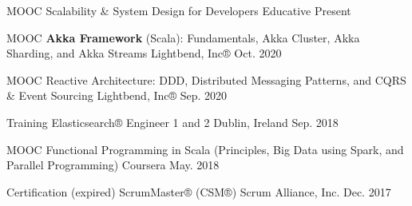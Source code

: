 
\begin{cvhonors}

  \cvhonor
    {MOOC}
    {Scalability \& System Design for Developers}
    {Educative}
    {Present}

  \cvhonor
    {MOOC}
    {\textbf{Akka Framework} (Scala): Fundamentals, Akka Cluster, Akka Sharding, and Akka Streams}
    {Lightbend, Inc®}
    {Oct. 2020}

  \cvhonor
    {MOOC}
    {Reactive Architecture: DDD, Distributed Messaging Patterns, and CQRS \& Event Sourcing}
    {Lightbend, Inc®}
    {Sep. 2020}

  \cvhonor
    {Training}
    {Elasticsearch® Engineer 1 and 2}
    {Dublin, Ireland}
    {Sep. 2018}

  \cvhonor
    {MOOC}
    {Functional Programming in Scala (Principles, Big Data using Spark, and Parallel Programming)}
    {Coursera}
    {May. 2018}
  
  \cvhonor
    {Certification (expired)}
    {ScrumMaster® (CSM®)}
    {Scrum Alliance, Inc.}
    {Dec. 2017}

\end{cvhonors}